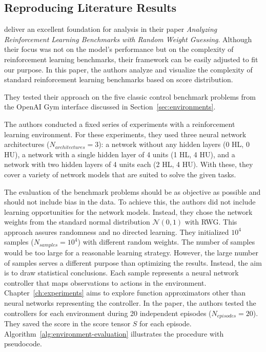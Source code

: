 \subsection{Reproducing Literature Results}
\cite{oller_analyzing_2020} deliver an excellent foundation for analysis in their paper \emph{Analyzing Reinforcement Learning Benchmarks with Random Weight Guessing}. Although their focus was not on the model's performance but on the complexity of reinforcement learning benchmarks, their framework can be easily adjusted to fit our purpose. In this paper, the authors analyze and visualize the complexity of standard reinforcement learning benchmarks based on score distribution.

They tested their approach on the five classic control benchmark problems from the OpenAI Gym interface discussed in Section~\ref{sec:environments}.

The authors conducted a fixed series of experiments with a reinforcement learning environment. For these experiments, they used three neural network architectures ($N_{architectures}=3$): a network without any hidden layers (0 HL, 0 HU), a network with a single hidden layer of 4 units (1 HL, 4 HU), and a network with two hidden layers of 4 units each (2 HL, 4 HU). With these, they cover a variety of network models that are suited to solve the given tasks.

The evaluation of the benchmark problems should be as objective as possible and should not include bias in the data. To achieve this, the authors did not include learning opportunities for the network models. Instead, they chose the network weights from the standard normal distribution $\mathcal{N}(0,1)$ with RWG. This approach assures randomness and no directed learning. They initialized $10^4$ samples ($N_{samples}=10^4$) with different random weights. The number of samples would be too large for a reasonable learning strategy. However, the large number of samples serves a different purpose than optimizing the results. Instead, the aim is to draw statistical conclusions. Each sample represents a neural network controller that maps observations to actions in the environment. Chapter~\ref{ch:experiments} aims to explore function approximators other than neural networks representing the controller. In the paper, the authors tested the controllers for each environment during 20 independent episodes ($N_{episodes}=20$). They saved the score in the score tensor $S$ for each episode. Algorithm~\ref{alg:environment-evaluation} illustrates the procedure with pseudocode.

